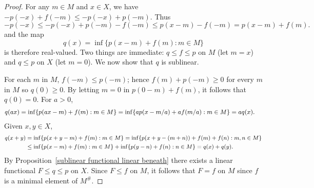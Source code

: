 \begin{proof}
For any $m\in M$ and $x\in X$, we have $-p(-x)+f(-m)\leq -p(-x)+p(-m)$. Thus
\[-p(-x)\leq -p(-x)+p(-m)-f(-m)\leq p(x-m)-f(-m)=p(x-m)+f(m).\]
and the map
\[q(x)=\inf\{p(x-m)+f(m):m\in M\}\]
is therefore real-valued. Two things are immediate: $q\leq f\leq p$ on $M$ (let $m=x$) and $q\leq p$ on $X$ (let $m=0$). We now show that $q$ is sublinear.\par
For each $m$ in $M$, $f(-m)\leq p(-m)$; hence $f(m)+p(-m)\geq 0$ for every $m$ in $M$ so $q(0)\geq 0$. By letting $m=0$ in $p(0-m)+f(m)$, it follows  that $q(0)=0$. For $a>0$,
\begin{equation*}\small
\begin{aligned}
q(ax)&=\inf\{p(ax-m)+f(m):m\in M\}=\inf\{ap(x-m/a)+af(m/a):m\in M\}=aq(x).
\end{aligned}
\end{equation*}
Given $x,y\in X$,
\begin{equation*}\small
\begin{aligned}
q(x+y)&=\inf\{p(x+y-m)+f(m):m\in M\}=\inf\{p(x+y-(m+n))+f(m)+f(n):m,n\in M\}\\
&\leq\inf\{p(x-m)+f(m):m\in M\}+\inf\{p(y-n)+f(n):n\in M\}=q(x)+q(y).
\end{aligned}
\end{equation*}
By Proposition~\ref{sublinear functional linear beneath} there exists a linear functional $F\leq q\leq p$ on $X$. Since $F\leq f$ on $M$, it follows that $F=f$ on $M$ since $f$ is a minimal element of $M^{\#}$.
\end{proof}

